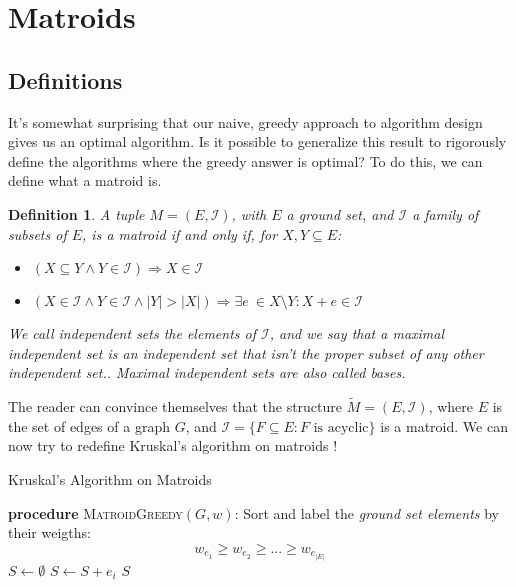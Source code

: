 \documentclass{report}
\newcommand{\II}{\ensuremath{\mathcal{I}}}
\newcommand{\takes}{\ensuremath{\leftarrow}}
\newtheorem{definition}{Definition}
\begin{document}
  \section{Matroids}

  \subsection{Definitions}

  It's somewhat surprising that our naive, greedy approach to algorithm design gives us an optimal algorithm. Is it possible to generalize this result to rigorously define the algorithms where the greedy answer is optimal? To do this, we can define what a matroid is.

  \begin{definition}
    A tuple $M = (E, \II)$, with $E$ a ground set, and $\II$ a family of subsets of $E$, is a \emph{matroid} if and only if, for $X, Y \subseteq E$:
    \begin{itemize}
      \item[$(I_1)$] $(X \subseteq Y \land Y \in \II) \Rightarrow X \in \II$
      \item[$(I_2)$] $(X \in \II \land Y \in \II \land |Y| > |X|) \Rightarrow \exists e \ \in X \setminus Y: X + e \in \II$
    \end{itemize}
    We call independent sets the elements of $\II$, and we say that a maximal independent set is an independent set that isn't the proper subset of any other independent set.\footnotemark. Maximal independent sets are also called bases.
  \end{definition}


  The reader can convince themselves that the structure $\tilde M = (E, \II)$, where $E$ is the set of edges of a graph $G$, and $\II = \{F \subseteq E: F \text{ is acyclic}\}$ is a matroid. We can now try to redefine Kruskal's algorithm on matroids !

  \begin{center}
    \begin{minipage}{.9\linewidth}
      \begin{algorithm}[H]
        \caption{Kruskal's Algorithm on Matroids}
        \label{MatroidKruskal}
        \begin{algorithmic}[1]
          \item[] \textbf{procedure} \textsc{MatroidGreedy}$(G, w)$:
          \STATE Sort and label the \emph{ground set elements} by their weigths: \[w_{e_1} \geqslant w_{e_2} \geqslant ... \geqslant  w_{e_{|E|}}\]
          \STATE $S \takes \emptyset$
          \FOR{$i \takes 1 \text{ to } |E|$}
          	\IF{$S + e_i \in \II$}
          	  \STATE $S \takes S + e_i$
          	\ENDIF
          \ENDFOR
          \RETURN $S$
        \end{algorithmic}
      \end{algorithm}
    \end{minipage}
  \end{center}
\end{document}
